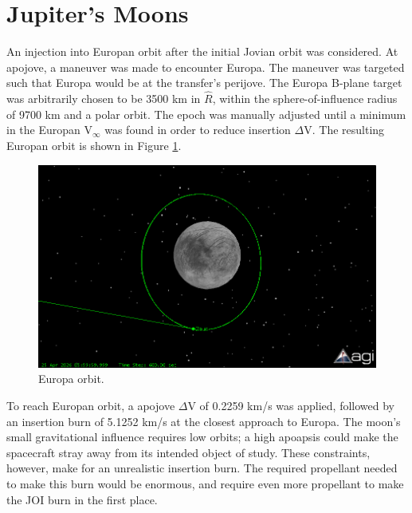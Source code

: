 \documentclass[]{aiaa-tc}%
\begin{document}
	\section{Jupiter's Moons}
An injection into Europan orbit after the initial Jovian orbit was considered. At apojove, a maneuver was made to encounter Europa. The maneuver was targeted such that Europa would be at the transfer's perijove. The Europa B-plane target was arbitrarily chosen to be 3500 km in $\hat{R}$, within the sphere-of-influence radius of 9700 km and a polar orbit. The epoch was manually adjusted until a minimum in the Europan V$_\infty$ was found in order to reduce insertion $\Delta$V. The resulting Europan orbit is shown in Figure \ref{fig:EuropaInjection}.
	\begin{figure}[H]
		\centering
			\includegraphics[width = 16cm]{../Figures/EuOI_From_Earth.png}
		\caption{Europa orbit. }
		\label{fig:EuropaInjection}
	\end{figure}	

To reach Europan orbit, a apojove $\Delta$V of 0.2259 km/s was applied, followed by an insertion burn of 5.1252 km/s at the closest approach to Europa. The moon's small gravitational influence requires low orbits; a high apoapsis could make the spacecraft stray away from its intended object of study. These constraints, however, make for an unrealistic insertion burn. The required propellant needed to make this burn would be enormous, and require even more propellant to make the JOI burn in the first place. 

	\vspace{5 mm}
\end{document}
